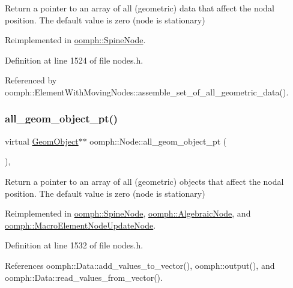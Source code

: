 Return a pointer to an array of all (geometric) data that affect the nodal position. The default value is zero (node is stationary) 



Reimplemented in \hyperlink{classoomph_1_1SpineNode_a0fbb7845412caffe3908f6d972f9df87}{oomph\+::\+Spine\+Node}.



Definition at line 1524 of file nodes.\+h.



Referenced by oomph\+::\+Element\+With\+Moving\+Nodes\+::assemble\+\_\+set\+\_\+of\+\_\+all\+\_\+geometric\+\_\+data().

\mbox{\label{classoomph_1_1Node_a2e05b79b6b3249e3ebd9096a550c93b6}} 
\subsubsection{\texorpdfstring{all\+\_\+geom\+\_\+object\+\_\+pt()}{all\_geom\_object\_pt()}}
{\footnotesize\ttfamily virtual \hyperlink{classoomph_1_1GeomObject}{Geom\+Object}$\ast$$\ast$ oomph\+::\+Node\+::all\+\_\+geom\+\_\+object\+\_\+pt (\begin{DoxyParamCaption}{ }\end{DoxyParamCaption})\hspace{0.3cm}{\ttfamily [inline]}, {\ttfamily [virtual]}}



Return a pointer to an array of all (geometric) objects that affect the nodal position. The default value is zero (node is stationary) 



Reimplemented in \hyperlink{classoomph_1_1SpineNode_a420fcf9b30eea609308298dd54558f92}{oomph\+::\+Spine\+Node}, \hyperlink{classoomph_1_1AlgebraicNode_aac2c907cb2258892583d38e8c3e52326}{oomph\+::\+Algebraic\+Node}, and \hyperlink{classoomph_1_1MacroElementNodeUpdateNode_a9664dec4bafcd4f27b2510c65389c1c2}{oomph\+::\+Macro\+Element\+Node\+Update\+Node}.



Definition at line 1532 of file nodes.\+h.



References oomph\+::\+Data\+::add\+\_\+values\+\_\+to\+\_\+vector(), oomph\+::output(), and oomph\+::\+Data\+::read\+\_\+values\+\_\+from\+\_\+vector().



